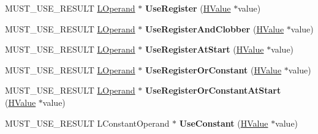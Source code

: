 \begin{DoxyCompactItemize}
\item 
M\+U\+S\+T\+\_\+\+U\+S\+E\+\_\+\+R\+E\+S\+U\+LT \hyperlink{classv8_1_1internal_1_1_l_operand}{L\+Operand} $\ast$ {\bfseries Use\+Register} (\hyperlink{classv8_1_1internal_1_1_h_value}{H\+Value} $\ast$value)\hypertarget{classv8_1_1internal_1_1_l_chunk_builder_a71d4b11b7eca26df2551720af10eeb8d}{}\label{classv8_1_1internal_1_1_l_chunk_builder_a71d4b11b7eca26df2551720af10eeb8d}

\item 
M\+U\+S\+T\+\_\+\+U\+S\+E\+\_\+\+R\+E\+S\+U\+LT \hyperlink{classv8_1_1internal_1_1_l_operand}{L\+Operand} $\ast$ {\bfseries Use\+Register\+And\+Clobber} (\hyperlink{classv8_1_1internal_1_1_h_value}{H\+Value} $\ast$value)\hypertarget{classv8_1_1internal_1_1_l_chunk_builder_ab4b0fa0ce539ce9392160f001f22c707}{}\label{classv8_1_1internal_1_1_l_chunk_builder_ab4b0fa0ce539ce9392160f001f22c707}

\item 
M\+U\+S\+T\+\_\+\+U\+S\+E\+\_\+\+R\+E\+S\+U\+LT \hyperlink{classv8_1_1internal_1_1_l_operand}{L\+Operand} $\ast$ {\bfseries Use\+Register\+At\+Start} (\hyperlink{classv8_1_1internal_1_1_h_value}{H\+Value} $\ast$value)\hypertarget{classv8_1_1internal_1_1_l_chunk_builder_af42aa233d6d4e068d8c2f2b4fa82c4da}{}\label{classv8_1_1internal_1_1_l_chunk_builder_af42aa233d6d4e068d8c2f2b4fa82c4da}

\item 
M\+U\+S\+T\+\_\+\+U\+S\+E\+\_\+\+R\+E\+S\+U\+LT \hyperlink{classv8_1_1internal_1_1_l_operand}{L\+Operand} $\ast$ {\bfseries Use\+Register\+Or\+Constant} (\hyperlink{classv8_1_1internal_1_1_h_value}{H\+Value} $\ast$value)\hypertarget{classv8_1_1internal_1_1_l_chunk_builder_aace121601a2caa8e6684cc5d5963f0df}{}\label{classv8_1_1internal_1_1_l_chunk_builder_aace121601a2caa8e6684cc5d5963f0df}

\item 
M\+U\+S\+T\+\_\+\+U\+S\+E\+\_\+\+R\+E\+S\+U\+LT \hyperlink{classv8_1_1internal_1_1_l_operand}{L\+Operand} $\ast$ {\bfseries Use\+Register\+Or\+Constant\+At\+Start} (\hyperlink{classv8_1_1internal_1_1_h_value}{H\+Value} $\ast$value)\hypertarget{classv8_1_1internal_1_1_l_chunk_builder_a14ca10ac408e3ec8501d2875ddf606fc}{}\label{classv8_1_1internal_1_1_l_chunk_builder_a14ca10ac408e3ec8501d2875ddf606fc}

\item 
M\+U\+S\+T\+\_\+\+U\+S\+E\+\_\+\+R\+E\+S\+U\+LT L\+Constant\+Operand $\ast$ {\bfseries Use\+Constant} (\hyperlink{classv8_1_1internal_1_1_h_value}{H\+Value} $\ast$value)\hypertarget{classv8_1_1internal_1_1_l_chunk_builder_a9714b0e3aa64c7f2b1e8fc8a0c786826}{}\label{classv8_1_1internal_1_1_l_chunk_builder_a9714b0e3aa64c7f2b1e8fc8a0c786826}


\end{DoxyCompactItemize}

